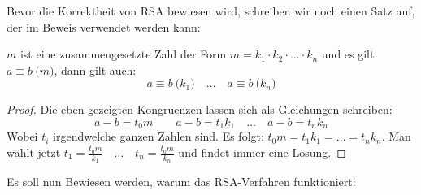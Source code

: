 \noindent
Bevor die Korrektheit von RSA bewiesen wird, schreiben wir noch einen Satz auf, der im
Beweis verwendet werden kann:

\begin{satz}
  \label{satz:composite-mod}
  $m$ ist eine zusammengesetzte Zahl der Form $m = k_1 \cdot k_2 \cdot \ldots \cdot k_n$ und
  es gilt $a \equiv b \pod{m}$, dann gilt auch:
  \begin{equation*}
    a \equiv b \pod{k_1} \quad\ldots\quad a \equiv b \pod{k_n}
  \end{equation*}
\end{satz}
\begin{proof}
  Die eben gezeigten Kongruenzen lassen sich als Gleichungen schreiben:
  \begin{equation*}
    a - b = t_0 m \qquad a - b = t_1k_1 \quad\ldots\quad a - b = t_nk_n
  \end{equation*}
  Wobei $t_i$ irgendwelche ganzen Zahlen sind. Es folgt: $t_0m = t_1k_1 = \ldots = t_nk_n$.
  Man wählt jetzt
  $t_1 = \frac{t_0m}{k_1} \quad\ldots\quad t_n = \frac{t_0m}{k_n}$
  und findet immer eine Lösung.
\end{proof}

\noindent
Es soll nun Bewiesen werden, warum das RSA-Verfahren funktioniert:

